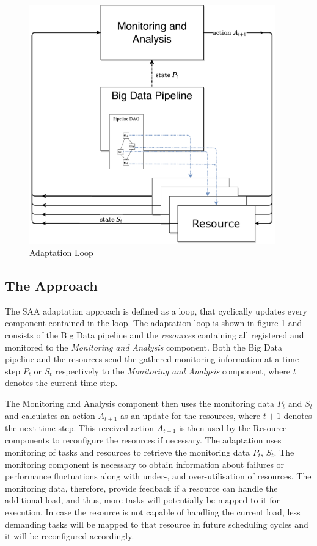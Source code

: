     \begin{figure}[h!]
        \centering
        \includegraphics[width=0.95\textwidth]{figures/monitoring_with_inner_resources.drawio.pdf}
        \caption{Adaptation Loop}
        \label{fig:adaptation-loop}
    \end{figure}

    \subsection{The Approach}

      The SAA adaptation approach is defined as a loop, that cyclically updates every component contained in the loop.
      The adaptation loop is shown in figure \ref{fig:adaptation-loop} and consists of the Big Data pipeline and the \emph{resources} containing all registered and monitored to the \emph{Monitoring and Analysis} component. 
      Both the Big Data pipeline and the resources send the gathered monitoring information at a time step $P_t$ or $S_t$ respectively to the \emph{Monitoring and Analysis} component, where $t$ denotes the current time step.

      The Monitoring and Analysis component then uses the monitoring data $P_t$ and $S_t$ and calculates an action $A_{t+1}$ as an update for the resources, where $t+1$ denotes the next time step.
      This received action $A_{t+1}$ is then used by the Resource components to reconfigure the resources if necessary.
      The adaptation uses monitoring of tasks and resources to retrieve the monitoring data $P_t$, $S_t$.
      The monitoring component is necessary to obtain information about failures or performance fluctuations along with under-, and over-utilisation of resources.
      The monitoring data, therefore, provide feedback if a resource can handle the additional load, and thus, more tasks will potentially be mapped to it for execution. 
      In case the resource is not capable of handling the current load, less demanding tasks will be mapped to that resource in future scheduling cycles and it will be reconfigured accordingly.

